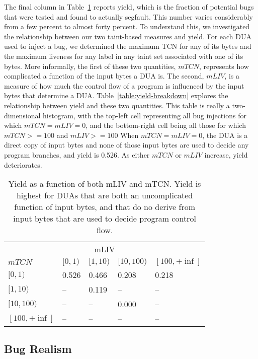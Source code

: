 The final column in Table~\ref{table:open-source-targets} reports yield, which is the fraction of potential bugs that were tested and found to actually segfault.
This number varies considerably from a few percent to almost forty percent.
To understand this, we investigated the relationship between our two taint-based measures and yield.
For each DUA used to inject a bug, we determined the maximum TCN for any of its bytes and the maximum liveness for any label in any taint set associated with one of its bytes.  
More informally, the first of these two quantities, $mTCN$, represents how complicated a function of the input bytes a DUA is.
The second, $mLIV$, is a measure of how much the control flow of a program is influenced by the input bytes that determine a DUA.
Table~\ref{table:yield-breakdown} explores the relationship between yield and these two quantities. 
This table is really a two-dimensional histogram, with the top-left cell representing all bug injections for which $mTCN=mLIV=0$, and the bottom-right cell being all those for which $mTCN>=100$ and $mLIV>=100$
When $mTCN=mLIV=0$, the DUA is a direct copy of input bytes and none of those input bytes are used to decide any program branches, and yield is 0.526.
As either $mTCN$ or $mLIV$ increase, yield deteriorates.  

\begin{table}
\centering
\begin{tabular}{l|l|l|l|l} 
 & \multicolumn{3}{c}{mLIV} &  \\  
$mTCN$ &         $[0,1)$ & $[1,10)$ & $[10,100)$ & $[100,+\inf]$ \\  \hline 
$[0,1)$ &       0.526   & 0.466    & 0.208      & 0.218 \\
$[1,10)$ &      --      & 0.119    & --         & --    \\
$[10,100)$ &    --      & --       & 0.000      & --    \\
$[100,+\inf]$ & --      & --       & --         & -- \\ 
\end{tabular}
\caption{Yield as a function of both mLIV and mTCN.  
Yield is highest for DUAs that are both an uncomplicated function of input bytes, and that do no derive from input bytes that are used to decide program control flow.}
\label{table:open-source-targets}
\end{table}


\subsection{Bug Realism}

